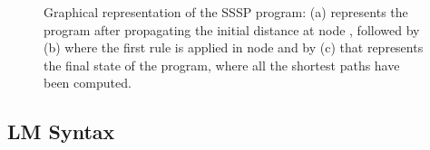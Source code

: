 \begin{figure}[ht]
\begin{center}
  \hspace{0.01cm}
  \hspace{0.01cm}
\end{center}
\caption{Graphical representation of the SSSP program: (a) represents the
   program after propagating the initial distance at node , followed by
   (b) where the first rule is applied in node  and by (c) that
   represents the final state of the program, where all the shortest paths
   have been computed.}
\label{fig:shortest_path_program}
\end{figure}


\subsection{LM Syntax}

